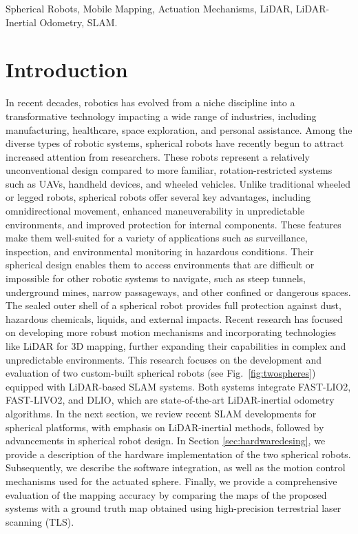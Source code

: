 \documentclass[a4paper, conference]{IEEEtran}
\begin{document}
\begin{IEEEkeywords}
Spherical Robots, Mobile Mapping, Actuation Mechanisms, LiDAR, LiDAR-Inertial Odometry, SLAM.
\end{IEEEkeywords}

\section{Introduction}
In recent decades, robotics has evolved from a niche discipline into a transformative technology impacting a wide range of industries, including manufacturing, healthcare, space exploration, and personal assistance. 
Among the diverse types of robotic systems, spherical robots have recently begun to attract increased attention from researchers. These robots represent a relatively unconventional design compared to more familiar, rotation-restricted systems such as UAVs, handheld devices, and wheeled vehicles. 
Unlike traditional wheeled or legged robots, spherical robots offer several key advantages, including omnidirectional movement, enhanced maneuverability in unpredictable environments, and improved protection for internal components. 
These features make them well-suited for a variety of applications such as surveillance, inspection, and environmental monitoring in hazardous conditions. 
Their spherical design enables them to access environments that are difficult or impossible for other robotic systems to navigate, such as steep tunnels, underground mines, narrow passageways, and other confined or dangerous spaces.
The sealed outer shell of a spherical robot provides full protection against dust, hazardous chemicals, liquids, and external impacts. 
Recent research has focused on developing more robust motion mechanisms \cite{roboball,novelsphere,pendulum_sphere} and incorporating technologies like LiDAR for 3D mapping, further expanding their capabilities in complex and unpredictable environments\cite{Kalman_filter_sphere,DAEDALUS,sphere_Fabi_1}.
This research focuses on the development and evaluation of two custom-built spherical robots (see Fig.~\ref{fig:twospheres}) equipped with LiDAR-based SLAM systems. 
Both systems integrate FAST-LIO2\cite{fastlio2}, FAST-LIVO2\cite{fastlivo2}, and DLIO\cite{dlio}, which are state-of-the-art LiDAR-inertial odometry algorithms.
In the next section, we review recent SLAM developments for spherical platforms, with emphasis on LiDAR-inertial methods, followed by advancements in spherical robot design.
In Section \ref{sec:hardwaredesing}, we provide a description of the hardware implementation of the two spherical robots. 
Subsequently, we describe the software integration, as well as the motion control mechanisms used for the actuated sphere. 
Finally, we provide a comprehensive evaluation of the mapping accuracy by comparing the maps of the proposed systems with a ground truth map obtained using high-precision terrestrial laser scanning (TLS). 
\end{document}
